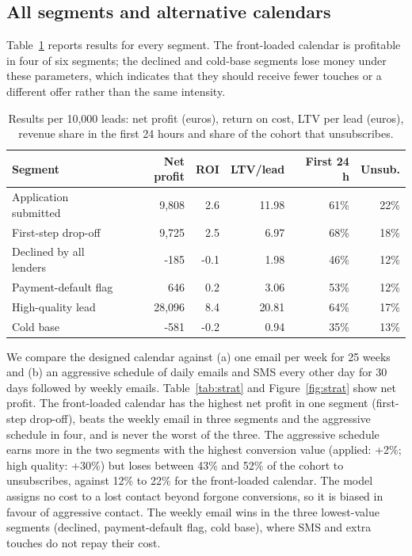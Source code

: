 \documentclass[10pt,a4paper]{article}
\begin{document}
\subsection{All segments and alternative calendars}
Table~\ref{tab:res} reports results for every segment. The front-loaded calendar is profitable in four of six segments; the declined and cold-base segments lose money under these parameters, which indicates that they should receive fewer touches or a different offer rather than the same intensity.
\begin{table}[H]\centering\small\caption{Results per 10{,}000 leads: net profit (euros), return on cost, LTV per lead (euros), revenue share in the first 24 hours and share of the cohort that unsubscribes.}\label{tab:res}
\begin{tabular}{lrrrrr}\toprule Segment & Net profit & ROI & LTV/lead & First 24 h & Unsub.\\\midrule
Application submitted & 9,808 & 2.6 & 11.98 & 61\% & 22\%\\
First-step drop-off & 9,725 & 2.5 & 6.97 & 68\% & 18\%\\
Declined by all lenders & -185 & -0.1 & 1.98 & 46\% & 12\%\\
Payment-default flag & 646 & 0.2 & 3.06 & 53\% & 12\%\\
High-quality lead & 28,096 & 8.4 & 20.81 & 64\% & 17\%\\
Cold base & -581 & -0.2 & 0.94 & 35\% & 13\%\\
\bottomrule\end{tabular}\end{table}
We compare the designed calendar against (a) one email per week for 25 weeks and (b) an aggressive schedule of daily emails and SMS every other day for 30 days followed by weekly emails. Table~\ref{tab:strat} and Figure~\ref{fig:strat} show net profit. The front-loaded calendar has the highest net profit in one segment (first-step drop-off), beats the weekly email in three segments and the aggressive schedule in four, and is never the worst of the three. The aggressive schedule earns more in the two segments with the highest conversion value (applied: +2\%; high quality: +30\%) but loses between 43\% and 52\% of the cohort to unsubscribes, against 12\% to 22\% for the front-loaded calendar. The model assigns no cost to a lost contact beyond forgone conversions, so it is biased in favour of aggressive contact. The weekly email wins in the three lowest-value segments (declined, payment-default flag, cold base), where SMS and extra touches do not repay their cost.
\end{document}
